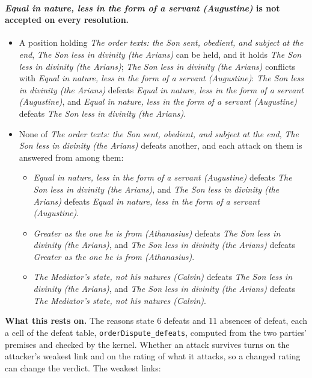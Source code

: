 \documentclass[11pt,paper=\testimonypaper,DIV=13,parskip=false]{scrartcl}
\begin{document}
\paragraph{\emph{Equal in nature, less in the form of a servant (Augustine)} is not accepted on every resolution.}
\begin{itemize}
\item A position holding \emph{The order texts: the Son sent, obedient, and subject at the end}, \emph{The Son less in divinity (the Arians)} can be held, and it holds \emph{The Son less in divinity (the Arians)}; \emph{The Son less in divinity (the Arians)} conflicts with \emph{Equal in nature, less in the form of a servant (Augustine)}: \emph{The Son less in divinity (the Arians)} defeats \emph{Equal in nature, less in the form of a servant (Augustine)}, and \emph{Equal in nature, less in the form of a servant (Augustine)} defeats \emph{The Son less in divinity (the Arians)}.
\item None of \emph{The order texts: the Son sent, obedient, and subject at the end}, \emph{The Son less in divinity (the Arians)} defeats another, and each attack on them is answered from among them:
\begin{itemize}
\item \emph{Equal in nature, less in the form of a servant (Augustine)} defeats \emph{The Son less in divinity (the Arians)}, and \emph{The Son less in divinity (the Arians)} defeats \emph{Equal in nature, less in the form of a servant (Augustine)}.
\item \emph{Greater as the one he is from (Athanasius)} defeats \emph{The Son less in divinity (the Arians)}, and \emph{The Son less in divinity (the Arians)} defeats \emph{Greater as the one he is from (Athanasius)}.
\item \emph{The Mediator’s state, not his natures (Calvin)} defeats \emph{The Son less in divinity (the Arians)}, and \emph{The Son less in divinity (the Arians)} defeats \emph{The Mediator’s state, not his natures (Calvin)}.
\end{itemize}
\end{itemize}
\par\noindent\textbf{What this rests on.} The reasons state 6 defeats and 11 absences of defeat, each a cell of the defeat table, \texttt{order\allowbreak{}Dispute\_\allowbreak{}defeats}, computed from the two parties' premises and checked by the kernel. Whether an attack survives turns on the attacker's weakest link and on the rating of what it attacks, so a changed rating can change the verdict. The weakest links:
\end{document}
